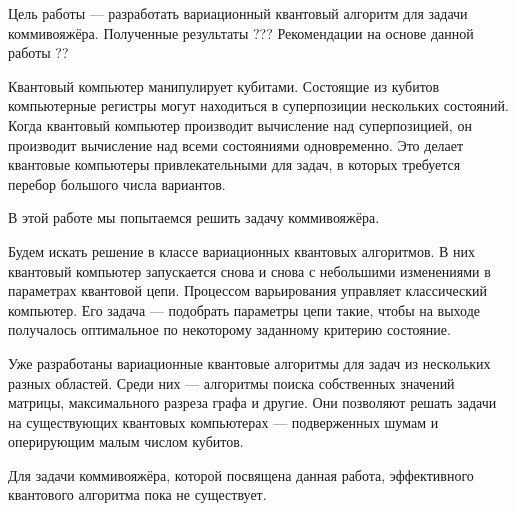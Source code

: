 

\usepackage{microtype}
\usepackage[extdef]{delimset}
\usepackage{csquotes} %
\usepackage{ragged2e}

\DeclareMathOperator{\Rx}{Rx}
\DeclareMathOperator{\Ry}{Ry}
\DeclareMathOperator{\Rz}{Rz}

\DeclareMathOperator*{\argmin}{argmin}
\DeclareMathOperator{\arctantwo}{arctan2}




\setcounter{page}{2}




Цель работы --- разработать вариационный квантовый алгоритм для задачи коммивояжёра. Полученные результаты ??? Рекомендации на основе данной работы ??




Квантовый компьютер манипулирует кубитами. Состоящие из кубитов компьютерные регистры могут находиться в суперпозиции нескольких состояний. Когда квантовый компьютер производит вычисление над суперпозицией, он производит вычисление над всеми состояниями одновременно. Это делает квантовые компьютеры привлекательными для задач, в которых требуется перебор большого числа вариантов. 

В этой работе мы попытаемся решить задачу коммивояжёра.

Будем искать решение в классе вариационных квантовых алгоритмов. В них квантовый компьютер запускается снова и снова с небольшими изменениями в параметрах квантовой цепи. Процессом варьирования управляет классический компьютер. Его задача --- подобрать параметры цепи такие, чтобы на выходе получалось оптимальное по некоторому заданному критерию состояние.

Уже разработаны вариационные квантовые алгоритмы для задач из нескольких разных областей. Среди них --- алгоритмы поиска собственных значений матрицы, максимального разреза графа и другие. Они позволяют решать задачи на существующих квантовых компьютерах --- подверженных шумам и оперирующим малым числом кубитов.

Для задачи коммивояжёра, которой посвящена данная работа, эффективного квантового алгоритма пока не существует. 

